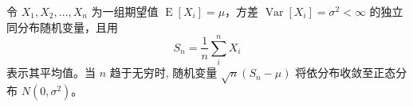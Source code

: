 \documentclass{article}
\begin{document}
\begin{CJK*}{UTF8}{gbsn}

令 $X_1, X_2, \ldots, X_n$ 为一组期望值 
$\operatorname{E}[X_i] = \mu$，方差 
$\operatorname{Var}[X_i] = \sigma^2 < \infty$
的独立同分布随机变量，且用
\begin{equation*}
S_n = \frac{1}{n}\sum_{i}^{n} X_i
\end{equation*}
表示其平均值。当 $n$ 趋于无穷时, 
随机变量  $\sqrt{n}(S_n - \mu)$ 
将依分布收敛至正态分布 $N(0, \sigma^2)$。


\clearpage\end{CJK*}
\end{document}

